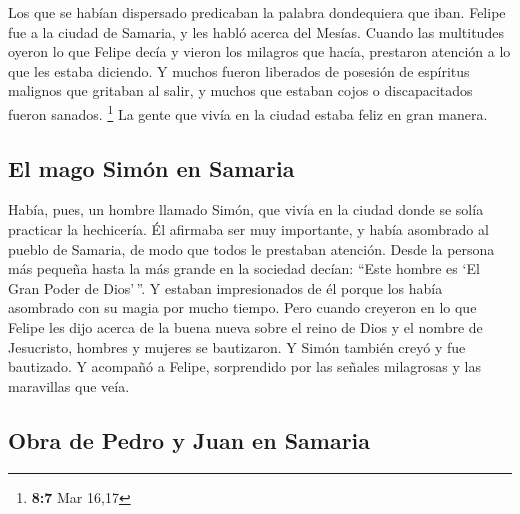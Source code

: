  Los que se habían dispersado predicaban la palabra
dondequiera que iban.  Felipe fue a la ciudad de Samaria,
y les habló acerca del Mesías.  Cuando las multitudes
oyeron lo que Felipe decía y vieron los milagros que hacía, prestaron
atención a lo que les estaba diciendo.  Y muchos fueron
liberados de posesión de espíritus malignos que gritaban al salir, y
muchos que estaban cojos o discapacitados fueron sanados. \footnote{\textbf{8:7}
  Mar 16,17}  La gente que vivía en la ciudad estaba feliz
en gran manera.

\hypertarget{el-mago-simuxf3n-en-samaria}{%
\subsection{El mago Simón en
Samaria}\label{el-mago-simuxf3n-en-samaria}}

 Había, pues, un hombre llamado Simón, que vivía en la
ciudad donde se solía practicar la hechicería. Él afirmaba ser muy
importante, y había asombrado al pueblo de Samaria,  de
modo que todos le prestaban atención. Desde la persona más pequeña hasta
la más grande en la sociedad decían: ``Este hombre es `El Gran Poder de
Dios'\,''.  Y estaban impresionados de él porque los
había asombrado con su magia por mucho tiempo.  Pero
cuando creyeron en lo que Felipe les dijo acerca de la buena nueva sobre
el reino de Dios y el nombre de Jesucristo, hombres y mujeres se
bautizaron.  Y Simón también creyó y fue bautizado. Y
acompañó a Felipe, sorprendido por las señales milagrosas y las
maravillas que veía.

\hypertarget{obra-de-pedro-y-juan-en-samaria}{%
\subsection{Obra de Pedro y Juan en
Samaria}\label{obra-de-pedro-y-juan-en-samaria}}

